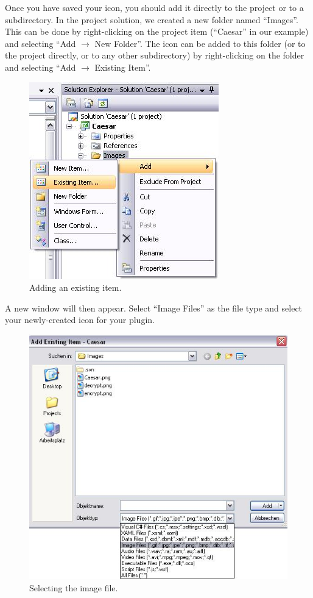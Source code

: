 Once you have saved your icon, you should add it directly to the project or to a subdirectory. In the project solution, we created a new folder named ``Images''. This can be done by right-clicking on the project item (``Caesar'' in our example) and selecting ``Add $\rightarrow$ New Folder''. The icon can be added to this folder (or to the project directly, or to any other subdirectory) by right-clicking on the folder and selecting ``Add $\rightarrow$ Existing Item''.

\begin{figure}[h!]
	\centering
		\includegraphics{figures/add_existing_item.jpg}
	\caption{Adding an existing item.}
	\label{fig:add_existing_item}
\end{figure}
\clearpage

A new window will then appear. Select ``Image Files'' as the file type and select your newly-created icon for your plugin.

\begin{figure}[h!]
	\centering
		\includegraphics{figures/choose_icon.jpg}
	\caption{Selecting the image file.}
	\label{fig:choose_icon}
\end{figure}
\clearpage

